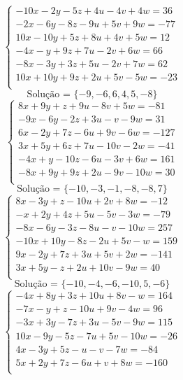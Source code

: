 \documentclass[12pt,oneside,a4paper]{article}
\begin{document}
\vspace{\baselineskip}
\begin{equation*}
\begin{cases}
-10x-2y-5z+4u-4v+4w=36 \\
-2x-6y-8z-9u+5v+9w=-77 \\
10x-10y+5z+8u+4v+5w=12 \\
-4x-y+9z+7u-2v+6w=66 \\
-8x-3y+3z+5u-2v+7w=62 \\
10x+10y+9z+2u+5v-5w=-23 \\
\end{cases}
\end{equation*}
\begin{equation*}
\text{Solução = }\{-9,-6,6,4,5,-8\}
\end{equation*}
\vspace{\baselineskip}
\begin{equation*}
\begin{cases}
8x+9y+z+9u-8v+5w=-81 \\
-9x-6y-2z+3u-v-9w=31 \\
6x-2y+7z-6u+9v-6w=-127 \\
3x+5y+6z+7u-10v-2w=-41 \\
-4x+y-10z-6u-3v+6w=161 \\
-8x+9y+9z+2u-9v-10w=30 \\
\end{cases}
\end{equation*}
\begin{equation*}
\text{Solução = }\{-10,-3,-1,-8,-8,7\}
\end{equation*}
\vspace{\baselineskip}
\begin{equation*}
\begin{cases}
8x-3y+z-10u+2v+8w=-12 \\
-x+2y+4z+5u-5v-3w=-79 \\
-8x-6y-3z-8u-v-10w=257 \\
-10x+10y-8z-2u+5v-w=159 \\
9x-2y+7z+3u+5v+2w=-141 \\
3x+5y-z+2u+10v-9w=40 \\
\end{cases}
\end{equation*}
\begin{equation*}
\text{Solução = }\{-10,-4,-6,-10,5,-6\}
\end{equation*}
\vspace{\baselineskip}
\begin{equation*}
\begin{cases}
-4x+8y+3z+10u+8v-w=164 \\
-7x-y+z-10u+9v-4w=96 \\
-3x+3y-7z+3u-5v-9w=115 \\
10x-9y-5z-7u+5v-10w=-26 \\
4x-3y+5z-u-v-7w=-84 \\
5x+2y+7z-6u+v+8w=-160 \\
\end{cases}
\end{equation*}
\end{document}
